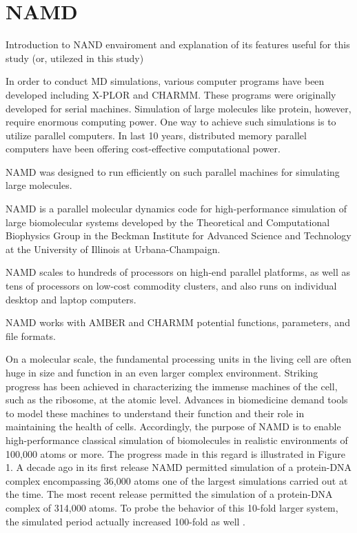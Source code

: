 \section{NAMD}
Introduction to NAND envairoment and explanation of its features useful for this study (or, utilezed in this study)

In order to conduct MD simulations, various computer programs have been developed including X-PLOR and CHARMM. These programs were originally developed for serial machines. Simulation of large molecules like protein, however, require enormous computing power. One way to achieve such simulations is to utilize parallel computers. In last 10 years, distributed memory parallel computers have been offering cost-effective computational power. 

NAMD was designed to run efficiently on such parallel machines for simulating large molecules. 

NAMD is a parallel molecular dynamics code for high-performance simulation of large biomolecular systems developed by the Theoretical and Computational Biophysics Group in the Beckman Institute for Advanced Science and Technology at the University of Illinois at Urbana-Champaign. 


NAMD scales to hundreds of processors on high-end parallel platforms, as well as tens of processors on low-cost commodity clusters, and also runs on individual desktop and laptop computers. 

NAMD works with AMBER and CHARMM potential functions, parameters, and file formats. 


On a molecular scale, the fundamental processing units in the living cell are often huge in size and function in an even larger complex environment. Striking progress has been achieved in characterizing the immense machines of the cell, such as the ribosome, at the atomic level. Advances in biomedicine demand tools to model these machines to understand their function and their role in maintaining the health of cells. Accordingly, the purpose of NAMD is to enable high-performance classical simulation of biomolecules in realistic environments of 100,000 atoms or more. The progress made in this regard is illustrated in Figure 1. A decade ago in its first release NAMD permitted simulation of a protein-DNA complex encompassing 36,000 atoms one of the largest simulations carried out at the time. The most recent release permitted the simulation of a protein-DNA complex of 314,000 atoms. To probe the behavior of this 10-fold larger system, the simulated period actually increased 100-fold as well \cite{ref:NAMD}.

